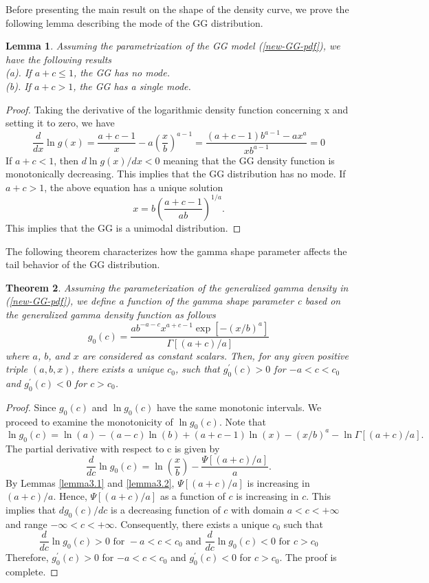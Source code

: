 \documentclass{ps}
\theoremstyle{plain}%
\newtheorem{theorem}{Theorem}[section]
\newtheorem{lemma}[theorem]{Lemma}
\theoremstyle{definition}
\theoremstyle{remark}
\begin{document}
Before presenting the main result on the shape of the density curve, we prove the following lemma describing the mode of the GG distribution. 

\begin{lemma}\label{lemma3.5}
	Assuming the parametrization of the GG model (\ref{new-GG-pdf}), we have the following results\\
	(a). If $a + c \le 1$, the GG has no mode.\\
	(b). If $a + c > 1$, the GG has a single mode.
\end{lemma}

\begin{proof}
	Taking the derivative of the logarithmic density function concerning x and setting it to zero, we have
	$$
	\frac{d}{dx}\ln g(x) = \frac{a+c-1}{x}-a\left( \frac{x}{b}\right)^{a-1}=\frac{(a+c-1)b^{a-1}-ax^a}{xb^{a-1}}=0
	$$
	If $a+c<1$, then $d\ln g(x)/dx < 0$ meaning that the GG density function is monotonically decreasing. This implies that the GG distribution has no mode. If $a + c > 1$, the above equation has a unique solution
	$$
	x = b\left( \frac{a+c-1}{ab} \right)^{1/a}.
	$$
	This implies that the GG is a unimodal distribution. 
\end{proof}

The following theorem characterizes how the gamma shape parameter affects the tail behavior of the GG distribution.

\begin{theorem}\label{thm3.1}
	Assuming the parameterization of the generalized gamma density in (\ref{new-GG-pdf}), we define a function of the gamma shape parameter c based on the generalized gamma density function as follows
	$$
	g_0(c)=\frac{ab^{-a-c}x^{a+c-1}\exp[-(x/b)^a]}{\Gamma[(a+c)/a]}
	$$	
	\noindent where $a$, $b$, and $x$ are considered as constant scalars. Then, for any given positive triple $(a, b, x)$, there exists a unique $c_0$, such that $g_0^\prime(c)>0$ for $-a < c < c_0$  and $g_0^\prime(c) < 0$ for $c > c_0$.
\end{theorem}

\begin{proof}
	Since $g_0(c)$ and $\ln g_0(c)$ have the same monotonic intervals. We proceed to examine the monotonicity of $\ln g_0(c)$. Note that
	$$
	\ln g_0(c) = \ln(a) - (a-c)\ln (b) + (a+c-1)\ln (x) - (x/b)^a - \ln \Gamma[(a+c)/a].
	$$	
	The partial derivative with respect to c is given by
	$$
	\frac{d}{dc}\ln g_0(c)=\ln\left( \frac{x}{b} \right)-\frac{\Psi[(a+c)/a]}{a}.
	$$
	By Lemmas \ref{lemma3.1} and \ref{lemma3.2}, $\Psi[(a+c)/a]$ is increasing in $(a+c)/a$. Hence, $\Psi[(a+c)/a]$ as a function of $c$ is increasing in $c$. This implies that $d g_0(c)/dc$  is a decreasing function of $c$ with domain $ a < c < +\infty$ and range $-\infty < c < +\infty$.  Consequently, there exists a unique $c_0$ such that 
	$$
	\frac{d}{dc}\ln g_0(c) > 0 \mbox{   for   } -a < c < c_0  \mbox{        and        } 
	\frac{d}{dc}\ln g_0(c) < 0 \mbox{   for   }   c > c_0
	$$
	Therefore, $g_0^\prime(c) > 0 $ for $-a < c < c_0$ and $g_0^\prime(c) < 0 $  for $c > c_0$.  The proof is complete.  
\end{proof}
\end{document}
